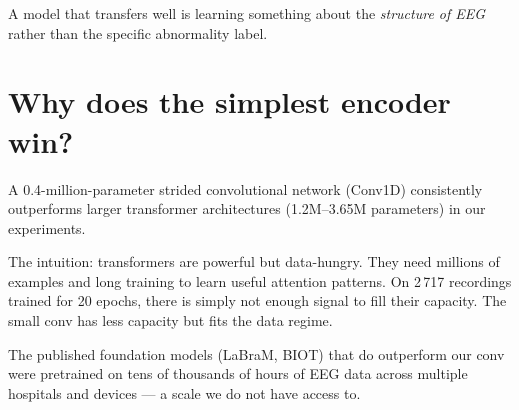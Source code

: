 \documentclass[11pt,a4paper]{article}
\begin{document}
A model that transfers well is learning something about the \emph{structure
of EEG} rather than the specific abnormality label.

\section*{Why does the simplest encoder win?}

A 0.4-million-parameter strided convolutional network (Conv1D) consistently
outperforms larger transformer architectures (1.2M--3.65M parameters) in
our experiments.

The intuition: transformers are powerful but data-hungry.  They need millions
of examples and long training to learn useful attention patterns.  On 2\,717
recordings trained for 20 epochs, there is simply not enough signal to fill
their capacity.  The small conv has less capacity but fits the data regime.

The published foundation models (LaBraM, BIOT) that do outperform our conv
were pretrained on tens of thousands of hours of EEG data across multiple
hospitals and devices — a scale we do not have access to.
\end{document}
